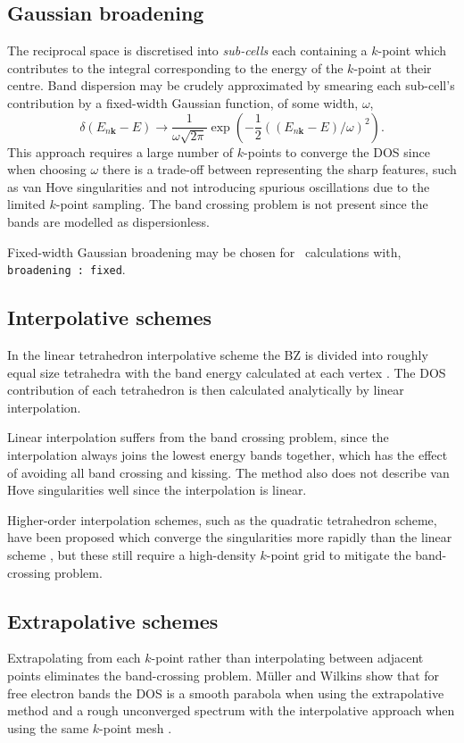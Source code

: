 \documentclass[a4paper,11pt,twoside]{book}
\newcommand{\kbf}{\mathbf{k}}
\begin{document}
\subsection{Gaussian broadening}
%
The reciprocal space is discretised into \emph{sub-cells} each containing a $k$-point which contributes to the integral corresponding to the energy of the $k$-point at their centre.
%
Band dispersion may be crudely approximated by smearing each sub-cell's contribution by a fixed-width Gaussian function, of some width, $\omega$,
\begin{equation}
\delta (E_{n\kbf}-E) \rightarrow \frac{1}{\omega\sqrt{2\pi}}\exp \left (-\frac{1}{2}((E_{n\kbf}-E)/\omega)^2 \right ).  
\end{equation}
This approach requires a large number of $k$-points to converge the DOS since when choosing $\omega$ there is a trade-off between representing the sharp features, such as van Hove singularities\cite{vanHove:PR:1953}  and not introducing spurious oscillations due to the limited $k$-point sampling.
%
The band crossing problem is not present since the bands are modelled as dispersionless.

Fixed-width Gaussian broadening may be chosen  for \optados\ calculations with, \texttt{broadening : fixed}.


\subsection{Interpolative schemes}
In the linear tetrahedron interpolative scheme the BZ is divided into
roughly equal size tetrahedra with the band energy calculated at each
vertex \cite{lehmann:PSS:1972}.
%
The DOS contribution of each tetrahedron is then calculated analytically by linear interpolation.

Linear interpolation suffers from the band crossing problem, since the interpolation always joins the lowest energy bands together, which has the effect of avoiding all band crossing and kissing.
%
The method also does not describe van Hove singularities well since the interpolation is linear. 

Higher-order interpolation schemes, such as the quadratic tetrahedron scheme,  have been proposed which converge the singularities more rapidly than the linear scheme  \cite{boon:JPC:1986,methfessel:JPC:1983,methfessel:JPC:1987}, but these still require a high-density $k$-point grid to mitigate the band-crossing problem.


\subsection{Extrapolative schemes}
Extrapolating from each $k$-point rather than interpolating between adjacent points eliminates the band-crossing problem.
%
M\"uller and Wilkins show that for free electron bands the DOS is a smooth parabola when using the extrapolative method and a rough unconverged spectrum with the interpolative approach when using the same $k$-point mesh \cite{muller:PRB:1984}.
\end{document}
